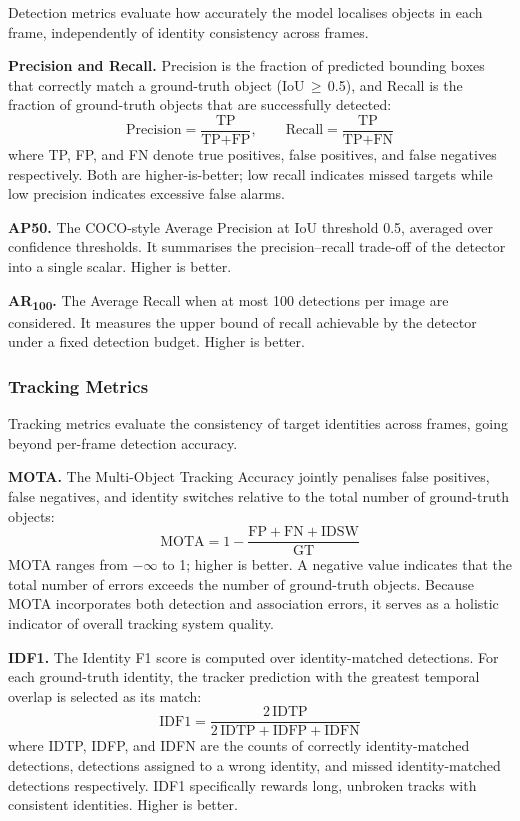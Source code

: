 \documentclass[
]{article}
\begin{document}
Detection metrics evaluate how accurately the model localises objects in each frame, independently of identity consistency across frames.

\textbf{Precision and Recall.} Precision is the fraction of predicted bounding boxes that correctly match a ground-truth object (IoU\,$\geq$\,0.5), and Recall is the fraction of ground-truth objects that are successfully detected:
\[
  \text{Precision} = \frac{\text{TP}}{\text{TP} + \text{FP}}, \qquad
  \text{Recall} = \frac{\text{TP}}{\text{TP} + \text{FN}}
\]
where TP, FP, and FN denote true positives, false positives, and false negatives respectively. Both are higher-is-better; low recall indicates missed targets while low precision indicates excessive false alarms.

\textbf{AP50.} The COCO-style Average Precision at IoU threshold 0.5, averaged over confidence thresholds. It summarises the precision--recall trade-off of the detector into a single scalar. Higher is better.

\textbf{AR\textsubscript{100}.} The Average Recall when at most 100 detections per image are considered. It measures the upper bound of recall achievable by the detector under a fixed detection budget. Higher is better.

\subsubsection*{Tracking Metrics}

Tracking metrics evaluate the consistency of target identities across frames, going beyond per-frame detection accuracy.

\textbf{MOTA.} The Multi-Object Tracking Accuracy jointly penalises false positives, false negatives, and identity switches relative to the total number of ground-truth objects:
\[
  \text{MOTA} = 1 - \frac{\text{FP} + \text{FN} + \text{IDSW}}{\text{GT}}
\]
MOTA ranges from $-\infty$ to 1; higher is better. A negative value indicates that the total number of errors exceeds the number of ground-truth objects. Because MOTA incorporates both detection and association errors, it serves as a holistic indicator of overall tracking system quality.

\textbf{IDF1.} The Identity F1 score is computed over identity-matched detections. For each ground-truth identity, the tracker prediction with the greatest temporal overlap is selected as its match:
\[
  \text{IDF1} = \frac{2\,\text{IDTP}}{2\,\text{IDTP} + \text{IDFP} + \text{IDFN}}
\]
where IDTP, IDFP, and IDFN are the counts of correctly identity-matched detections, detections assigned to a wrong identity, and missed identity-matched detections respectively. IDF1 specifically rewards long, unbroken tracks with consistent identities. Higher is better.
\end{document}
